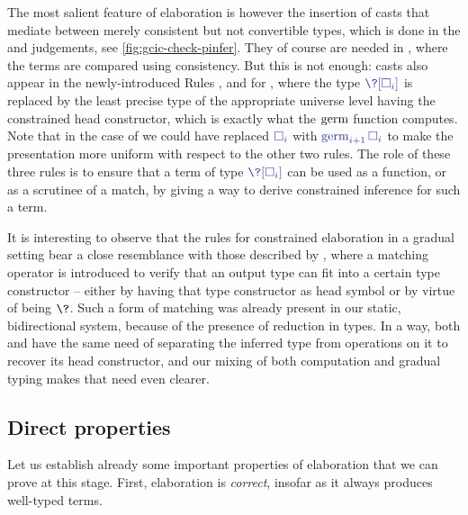 The most salient feature of elaboration is however the insertion of casts that mediate
between merely consistent but not convertible types, which is done in the 
and  judgements, see \cref{fig:gcic-check-pinfer}.
They of course are needed in ,
where the terms are compared using consistency.
But this is not enough: casts also appear in the newly-introduced Rules
,  and
 for ,
where the type $\tcol{\?[\uni[i]]}$ is replaced by the least precise type of
the appropriate universe level having the constrained head constructor, 
which is exactly what the $\operatorname{germ}$ function computes.
Note that in the case of  we could have replaced $\tcol{\uni[i]}$
with $\tcol{\stalkCIC{\unext{i}}{\uni[i]}}$ to make the presentation more uniform with respect
to the other two rules. The role of these three rules is to ensure that a term of type
$\tcol{\?[\uni[i]]}$ can be used as a function,
or as a scrutinee of a match, by giving a way to derive constrained inference for such a term.

It is interesting to observe that the rules for constrained elaboration in a gradual setting
bear a close resemblance with those described by
, where a matching operator is introduced to verify
that an output type can fit into a certain type constructor – either by having that type
constructor as head symbol or by virtue of being $\?$.
Such a form of matching was already present in our static, bidirectional system,
because of the presence of reduction in types. In a way, both \textcite{Cimini2016}
and  have the same need of separating the inferred type from operations
on it to recover its head constructor,
and our mixing of both computation and gradual typing makes that need even clearer.

\subsection{Direct properties}

Let us establish already some important properties of elaboration that we can
prove at this stage. First, elaboration is \emph{correct},
insofar as it always produces well-typed  terms.

